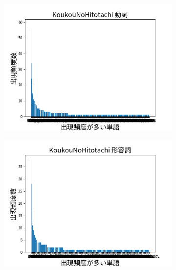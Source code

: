 \documentclass[onecolumn]{ujarticle}   %
\begin{document}
\begin{figure}[hb]
\begin{subfigure}{0.49\columnwidth}
		\end{subfigure}
		\begin{subfigure}{0.49\columnwidth}
			\centering
			\includegraphics[width=1.0\columnwidth]{data/dousi_KoukouNoHitotachi.png}
		\end{subfigure}
		\begin{subfigure}{0.49\columnwidth}
			\centering
			\includegraphics[width=1.0\columnwidth]{data/keiyosi_KoukouNoHitotachi.png}
		\end{subfigure}
		\begin{subfigure}{0.49\columnwidth}
			\centering

\end{subfigure}
\end{figure}
\end{document}
